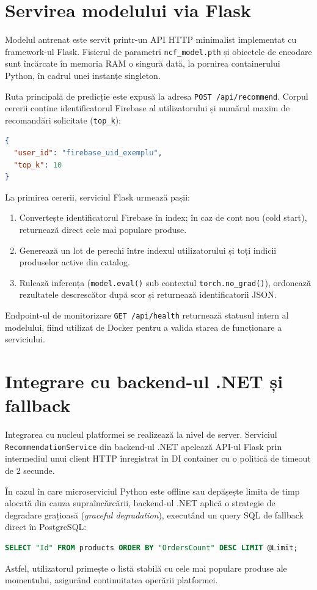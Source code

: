 \section{Servirea modelului via Flask}

Modelul antrenat este servit printr-un API HTTP minimalist implementat cu framework-ul Flask. Fișierul de parametri \texttt{ncf\_model.pth} și obiectele de encodare sunt încărcate în memoria RAM o singură dată, la pornirea containerului Python, în cadrul unei instanțe singleton.

Ruta principală de predicție este expusă la adresa \texttt{POST /api/recommend}. Corpul cererii conține identificatorul Firebase al utilizatorului și numărul maxim de recomandări solicitate (\texttt{top\_k}):
\begin{lstlisting}[language=JSON]
{
  "user_id": "firebase_uid_exemplu",
  "top_k": 10
}
\end{lstlisting}

La primirea cererii, serviciul Flask urmează pașii:
\begin{enumerate}
    \item Convertește identificatorul Firebase în index; în caz de cont nou (cold start), returnează direct cele mai populare produse.
    \item Generează un lot de perechi între indexul utilizatorului și toți indicii produselor active din catalog.
    \item Rulează inferența (\texttt{model.eval()} sub contextul \texttt{torch.no\_grad()}), ordonează rezultatele descrescător după scor și returnează identificatorii JSON.
\end{enumerate}

Endpoint-ul de monitorizare \texttt{GET /api/health} returnează statusul intern al modelului, fiind utilizat de Docker pentru a valida starea de funcționare a serviciului.

\section{Integrare cu backend-ul .NET și fallback}

Integrarea cu nucleul platformei se realizează la nivel de server. Serviciul \texttt{RecommendationService} din backend-ul .NET apelează API-ul Flask prin intermediul unui client HTTP înregistrat în DI container cu o politică de timeout de 2 secunde.

În cazul în care microserviciul Python este offline sau depășește limita de timp alocată din cauza supraîncărcării, backend-ul .NET aplică o strategie de degradare grațioasă (\textit{graceful degradation}), executând un query SQL de fallback direct în PostgreSQL:
\begin{lstlisting}[language=SQL]
SELECT "Id" FROM products ORDER BY "OrdersCount" DESC LIMIT @Limit;
\end{lstlisting}
Astfel, utilizatorul primește o listă stabilă cu cele mai populare produse ale momentului, asigurând continuitatea operării platformei.

